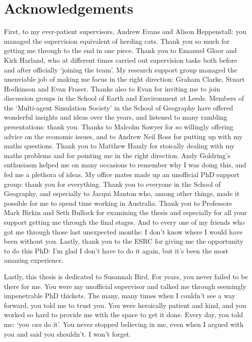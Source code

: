 

\chapter*{Acknowledgements}
\thispagestyle{empty}

First, to my ever-patient supervisors, Andrew Evans and Alison Heppenstall: you managed the supervision equivalent of herding cats. Thank you so much for getting me through to the end in one piece. Thank you to Emanuel Gloor and Kirk Harland, who at different times carried out supervision tasks both before and after officially `joining the team'. My research support group managed the unenviable job of making me focus in the right direction: Graham Clarke, Stuart Hodkinson and Evan Fraser. Thanks also to Evan for inviting me to join discussion groups in the School of Earth and Environment at Leeds. Members of the `Multi-agent Simulation Society' in the School of Geography have offered wonderful insights and ideas over the years, and listened to many rambling presentations: thank you. Thanks to Malcolm Sawyer for so willingly offering advice on the economic issues, and to Andrew Neil Ross for putting up with my maths questions. Thank you to Matthew Handy for stoically dealing with my maths problems and for pointing me in the right direction. Andy Goldring's enthusiasm helped me on many occasions to remember why I was doing this, and fed me a plethora of ideas. My office mates made up an unofficial PhD support group: thank you for everything. Thank you to everyone in the School of Geography, and especially to Jacqui Manton who, among other things, made it possible for me to spend time working in Australia. Thank you to Professors Mark Birkin and Seth Bullock for examining the thesis and especially for all your support getting me through the final stages. And to every one of my friends who got me through those last unexpected months: I don't know where I would have been without you. Lastly, thank you to the ESRC for giving me the opportunity to do this PhD: I'm glad I don't have to do it again, but it's been the most amazing experience.

\vspace{1cm}

Lastly, this thesis is dedicated to Susannah Bird. For years, you never failed to be there for me. You were my unofficial supervisor and talked me through seemingly impenetrable PhD thickets. The many, many times when I couldn't see a way forward, you told me to trust you. You were heroically patient and kind, and you worked so hard to provide me with the space to get it done. Every day, you told me: `you \emph{can} do it'. You never stopped believing in me, even when I argued with you and said you shouldn't. I won't forget.

